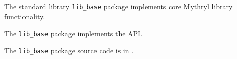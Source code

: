 
The standard library {\tt lib\_base} package implements core Mythryl library functionality.

The {\tt lib\_base} package implements the  API.

The {\tt lib\_base} package source code is in .
